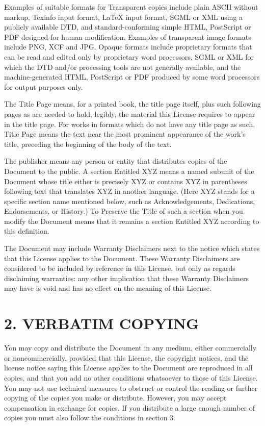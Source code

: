 \documentclass[captions=tableheading]{scrbook}
\begin{document}
Examples of suitable formats for Transparent copies include plain ASCII without markup, Texinfo input format, \LaTeX{} input format, SGML or XML using a publicly available DTD, and standard-conforming simple HTML, PostScript or PDF designed for human modification. Examples of transparent image formats include PNG, XCF and JPG. Opaque formats include proprietary formats that can be read and edited only by proprietary word processors, SGML or XML for which the DTD and/or processing tools are not generally available, and the machine-generated HTML, PostScript or PDF produced by some word processors for output purposes only.

The Title Page means, for a printed book, the title page itself, plus such following pages as are needed to hold, legibly, the material this License requires to appear in the title page. For works in formats which do not have any title page as such, Title Page means the text near the most prominent appearance of the work's title, preceding the beginning of the body of the text.

The publisher means any person or entity that distributes copies of the Document to the public.  A section Entitled XYZ means a named subunit of the Document whose title either is precisely XYZ or contains XYZ in parentheses following text that translates XYZ in another language. (Here XYZ stands for a specific section name mentioned below, such as Acknowledgements, Dedications, Endorsements, or History.) To Preserve the Title of such a section when you modify the Document means that it remains a section Entitled XYZ according to this definition.

The Document may include Warranty Disclaimers next to the notice which states that this License applies to the Document. These Warranty Disclaimers are considered to be included by reference in this License, but only as regards disclaiming warranties: any other implication that these Warranty Disclaimers may have is void and has no effect on the meaning of this License.
\section{2. VERBATIM COPYING}
\label{sec-18-3}


You may copy and distribute the Document in any medium, either commercially or noncommercially, provided that this License, the copyright notices, and the license notice saying this License applies to the Document are reproduced in all copies, and that you add no other conditions whatsoever to those of this License. You may not use technical measures to obstruct or control the reading or further copying of the copies you make or distribute. However, you may accept compensation in exchange for copies. If you distribute a large enough number of copies you must also follow the conditions in section 3.
\end{document}
